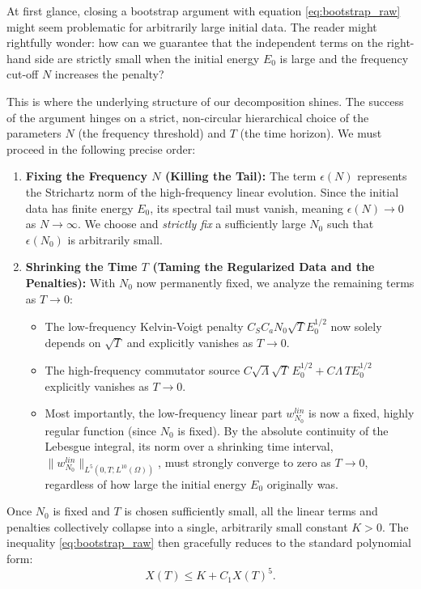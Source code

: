 \documentclass[11pt,letterpaper]{amsart}
\begin{document}
At first glance, closing a bootstrap argument with equation \eqref{eq:bootstrap_raw} might seem problematic for arbitrarily large initial data. The reader might rightfully wonder: how can we guarantee that the independent terms on the right-hand side are strictly small when the initial energy $E_0$ is large and the frequency cut-off $N$ increases the penalty?

This is where the underlying structure of our decomposition shines. The success of the argument hinges on a strict, non-circular hierarchical choice of the parameters $N$ (the frequency threshold) and $T$ (the time horizon). We must proceed in the following precise order:

\begin{enumerate}
    \item \textbf{Fixing the Frequency $N$ (Killing the Tail):} The term $\epsilon(N)$ represents the Strichartz norm of the high-frequency linear evolution. Since the initial data has finite energy $E_0$, its spectral tail must vanish, meaning $\epsilon(N) \to 0$ as $N \to \infty$. We choose and \textit{strictly fix} a sufficiently large $N_0$ such that $\epsilon(N_0)$ is arbitrarily small.

    \item \textbf{Shrinking the Time $T$ (Taming the Regularized Data and the Penalties):} With $N_0$ now permanently fixed, we analyze the remaining terms as $T \to 0$:
    \begin{itemize}
        \item The low-frequency Kelvin-Voigt penalty $C_S C_a N_0 \sqrt{T} E_0^{1/2}$ now solely depends on $\sqrt{T}$ and explicitly vanishes as $T \to 0$.
        \item The high-frequency commutator source $C\sqrt{\Lambda} \sqrt{T}\,E_0^{1/2} + C\Lambda\,T E_0^{1/2}$ explicitly vanishes as $T \to 0$.
        \item Most importantly, the low-frequency linear part $w_{N_0}^{lin}$ is now a fixed, highly regular function (since $N_0$ is fixed). By the absolute continuity of the Lebesgue integral, its norm over a shrinking time interval, $\|w_{N_0}^{lin}\|_{L^5(0,T; L^{10}(\Omega))}$, must strongly converge to zero as $T \to 0$, regardless of how large the initial energy $E_0$ originally was.
    \end{itemize}
\end{enumerate}

Once $N_0$ is fixed and $T$ is chosen sufficiently small, all the linear terms and penalties collectively collapse into a single, arbitrarily small constant $K > 0$. The inequality \eqref{eq:bootstrap_raw} then gracefully reduces to the standard polynomial form:
\begin{equation}\label{eq:polynomial_bootstrap}
    X(T) \le K + C_1 X(T)^5.
\end{equation}
\end{document}
